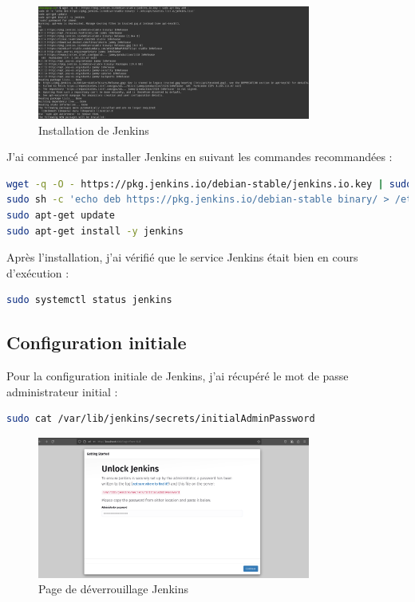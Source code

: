 \documentclass{article}
\begin{document}
\begin{figure}[h]
    \centering
    \includegraphics[width=0.8\textwidth]{images/jenkins_installation.png}
    \caption{Installation de Jenkins}
    \label{fig:jenkins_installation}
\end{figure}

J'ai commencé par installer Jenkins en suivant les commandes recommandées :

\begin{lstlisting}[language=bash]
wget -q -O - https://pkg.jenkins.io/debian-stable/jenkins.io.key | sudo apt-key add -
sudo sh -c 'echo deb https://pkg.jenkins.io/debian-stable binary/ > /etc/apt/sources.list.d/jenkins.list'
sudo apt-get update
sudo apt-get install -y jenkins
\end{lstlisting}

Après l'installation, j'ai vérifié que le service Jenkins était bien en cours d'exécution :

\begin{lstlisting}[language=bash]
sudo systemctl status jenkins
\end{lstlisting}

\subsection{Configuration initiale}
Pour la configuration initiale de Jenkins, j'ai récupéré le mot de passe administrateur initial :

\begin{lstlisting}[language=bash]
sudo cat /var/lib/jenkins/secrets/initialAdminPassword
\end{lstlisting}

\begin{figure}[h]
    \centering
    \includegraphics[width=0.8\textwidth]{images/jenkins_unlock.png}
    \caption{Page de déverrouillage Jenkins}
    \label{fig:jenkins_unlock}
\end{figure}
\end{document}
